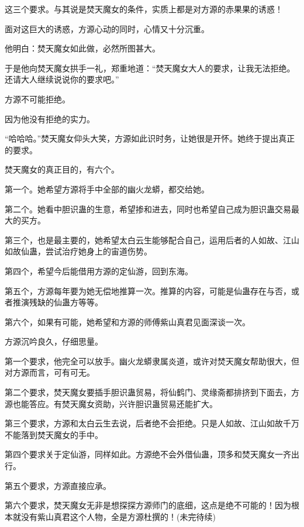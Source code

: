 \begin{this_body}
这三个要求。与其说是焚天魔女的条件，实质上都是对方源的赤果果的诱惑！

面对这巨大的诱惑，方源心动的同时，心情又十分沉重。

他明白：焚天魔女如此做，必然所图甚大。

于是他向焚天魔女拱手一礼，郑重地道：“焚天魔女大人的要求，让我无法拒绝。还请大人继续说说你的要求吧。”

方源不可能拒绝。

因为他没有拒绝的实力。

“哈哈哈。”焚天魔女仰头大笑，方源如此识时务，让她很是开怀。她终于提出真正的要求。

焚天魔女的真正目的，有六个。

第一个。她希望方源将手中全部的幽火龙蟒，都交给她。

第二个。她看中胆识蛊的生意，希望掺和进去，同时也希望自己成为胆识蛊交易最大的买方。

第三个，也是最主要的，她希望太白云生能够配合自己，运用后者的人如故、江山如故仙蛊，尝试治疗她身上的宙道伤势。

第四个，希望今后能借用方源的定仙游，回到东海。

第五个，方源每年要为她无偿地推算一次。推算的内容，可能是仙蛊存在与否，或者推演残缺的仙蛊方等等。

第六个，如果有可能，她希望和方源的师傅紫山真君见面深谈一次。

方源沉吟良久，仔细思量。

第一个要求，他完全可以放手。幽火龙蟒隶属炎道，或许对焚天魔女帮助很大，但对方源而言，可有可无。

第二个要求，焚天魔女要插手胆识蛊贸易，将仙鹤门、灵缘斋都排挤到下面去，方源也能答应。有焚天魔女资助，兴许胆识蛊贸易还能扩大。

第三个要求，方源和太白云生去说，后者绝不会拒绝。只是人如故、江山如故千万不能落到焚天魔女的手中。

第四个要求关于定仙游，同样如此。方源绝不会外借仙蛊，顶多和焚天魔女一齐出行。

第五个要求，方源直接应承。

第六个要求，焚天魔女无非是想探探方源师门的底细，这点是绝不可能的！因为根本就没有紫山真君这个人物，全是方源杜撰的！(未完待续)

\end{this_body}

